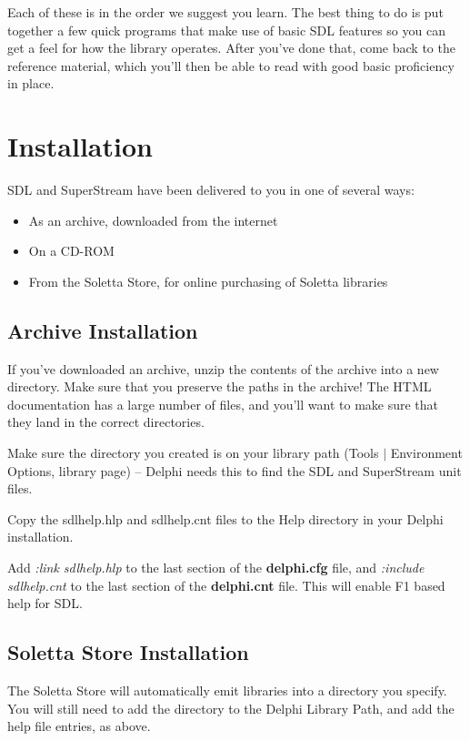 \documentclass{report}
\begin{document}
Each of these is in the order we suggest you learn. The best thing to do is
put together a few quick programs that make use of basic SDL features so you
can get a feel for how the library operates. After you've done that, come
back to the reference material, which you'll then be able to read with good
basic proficiency in place.

\chapter{Installation}

SDL and SuperStream have been delivered to you in one 
of several ways:

\begin{itemize}
\item As an archive, downloaded from the internet

\item On a CD-ROM

\item From the Soletta Store, for online purchasing of Soletta libraries
\end{itemize}

\section{Archive Installation}

If you've downloaded an archive, unzip the contents of the archive into a
new directory. Make sure that you preserve the paths in the archive!  The
HTML documentation has a large number of files, and you'll want to make sure
that they land in the correct directories.

Make sure the directory you created is on your library path (Tools 
$|$ Environment Options, library page) -- Delphi needs this to find the SDL
and SuperStream unit files.

Copy the sdlhelp.hlp and sdlhelp.cnt files to the Help directory 
in your Delphi installation.

Add \emph{:link sdlhelp.hlp} to the last section of the \textbf{delphi.cfg}
file, and \emph{:include sdlhelp.cnt} to the last section of the
\textbf{delphi.cnt} file. This will enable F1 based help for SDL.

\section{Soletta Store Installation}
The Soletta Store will automatically emit libraries into a directory you
specify. You will still need to add the directory to the Delphi Library
Path, and add the help file entries, as above.
\end{document}

